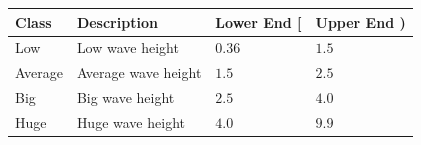 \documentclass[energies,article,accept,moreauthors,pdftex]{Definitions/mdpi}
\begin{document}
\begin{paracol}{2}
\begin{specialtable}[H]
{\begin{tabularx}{\columnwidth}{>{\PreserveBackslash\centering}m{\cellWidtha}>{\PreserveBackslash\centering}m{\cellWidthb}>{\PreserveBackslash\centering}m{\cellWidthc}>{\PreserveBackslash\centering}m{\cellWidthd}}
							
							
								
								\textbf{Class}&\textbf{Description}&\textbf{Lower End [}&\textbf{Upper End )}\\
			
									\midrule
								
								Low & Low wave height & $0.36$ & $1.5$\\ \midrule
								
								Average & Average wave height &$1.5$ & $2.5$\\ \midrule
								
								Big & Big wave height & $2.5$ & $4.0$\\ \midrule
								
								Huge & Huge wave height & $4.0$ &$9.9$\\

								\bottomrule
									
							\end{tabularx}}
						
						\end{specialtable}

	\vspace{-10pt}
									
				
				
\end{paracol}
\nointerlineskip
\end{document}
